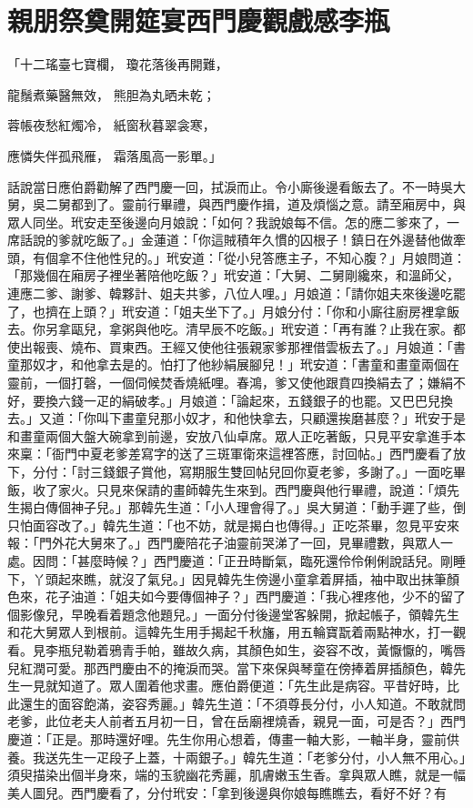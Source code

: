 %

\chapter{親朋祭奠開筵宴\KG 西門慶觀戲感李瓶}

「十二瑤臺七寶欄，  瓊花落後再開難，

龍鬚煮藥醫無效，  熊胆為丸晒未乾；

蓉帳夜愁紅燭冷，  紙窗秋暮翠衾寒，

應憐失伴孤飛雁，  霜落風高一影單。」

話說當日應伯爵勸解了西門慶一回，拭淚而止。令小廝後邊看飯去了。不一時吳大舅，吳二舅都到了。靈前行畢禮，與西門慶作揖，道及煩惱之意。請至廂房中，與眾人同坐。玳安走至後邊向月娘說：「如何？我說娘每不信。怎的應二爹來了，一席話說的爹就吃飯了。」金蓮道：「你這賊積年久慣的囚根子！鎮日在外邊替他做牽頭，有個拿不住他性兒的。」玳安道：「從小兒答應主子，不知心腹？」月娘問道：「那幾個在廂房子裡坐著陪他吃飯？」玳安道：「大舅、二舅剛纔來，和溫師父，連應二爹、謝爹、韓夥計、姐夫共爹，八位人哩。」月娘道：「請你姐夫來後邊吃罷了，也擠在上頭？」玳安道：「姐夫坐下了。」月娘分付：「你和小廝往廚房裡拿飯去。你另拿甌兒，拿粥與他吃。清早辰不吃飯。」玳安道：「再有誰？止我在家。都使出報喪、燒布、買東西。王經又使他往張親家爹那裡借雲板去了。」月娘道：「書童那奴才，和他拿去是的。怕打了他紗絹展腳兒！」玳安道：「書童和畫童兩個在靈前，一個打磬，一個伺候焚香燒紙哩。春鴻，爹又使他跟賁四換絹去了；嫌絹不好，要換六錢一疋的絹破孝。」月娘道：「論起來，五錢銀子的也罷。又巴巴兒換去。」又道：「你叫下畫童兒那小奴才，和他快拿去，只顧還挨磨甚麼？」玳安于是和畫童兩個大盤大碗拿到前邊，安放八仙卓席。眾人正吃著飯，只見平安拿進手本來稟：「衙門中夏老爹差寫字的送了三斑軍衛來這裡答應，討回帖。」西門慶看了放下，分付：「討三錢銀子賞他，寫期服生雙回帖兒回你夏老爹，多謝了。」一面吃畢飯，收了家火。只見來保請的畫師韓先生來到。西門慶與他行畢禮，說道：「煩先生揭白傳個神子兒。」那韓先生道：「小人理會得了。」吳大舅道：「動手遲了些，倒只怕面容改了。」韓先生道：「也不妨，就是揭白也傳得。」正吃茶畢，忽見平安來報：「門外花大舅來了。」西門慶陪花子油靈前哭涕了一回，見畢禮數，與眾人一處。因問：「甚麼時候？」西門慶道：「正丑時斷氣，臨死還伶伶俐俐說話兒。剛睡下，丫頭起來瞧，就沒了氣兒。」因見韓先生傍邊小童拿着屏插，袖中取出抹筆顏色來，花子油道：「姐夫如今要傳個神子？」西門慶道：「我心裡疼他，少不的留了個影像兒，早晚看着題念他題兒。」一面分付後邊堂客躲開，掀起帳子，領韓先生和花大舅眾人到根前。這韓先生用手揭起千秋旛，用五輪寶翫着兩點神水，打一觀看。見李瓶兒勒着鴉青手帕，雖故久病，其顏色如生，姿容不改，黃懨懨的，嘴唇兒紅潤可愛。那西門慶由不的掩淚而哭。當下來保與琴童在傍捧着屏插顏色，韓先生一見就知道了。眾人圍着他求畫。應伯爵便道：「先生此是病容。平昔好時，比此還生的面容飽滿，姿容秀麗。」韓先生道：「不須尊長分付，小人知道。不敢就問老爹，此位老夫人前者五月初一日，曾在岳廟裡燒香，親見一面，可是否？」西門慶道：「正是。那時還好哩。先生你用心想着，傳畫一軸大影，一軸半身，靈前供養。我送先生一疋段子上蓋，十兩銀子。」韓先生道：「老爹分付，小人無不用心。」須臾描染出個半身來，端的玉貌幽花秀麗，肌膚嫩玉生香。拿與眾人瞧，就是一幅美人圖兒。西門慶看了，分付玳安：「拿到後邊與你娘每瞧瞧去，看好不好？有